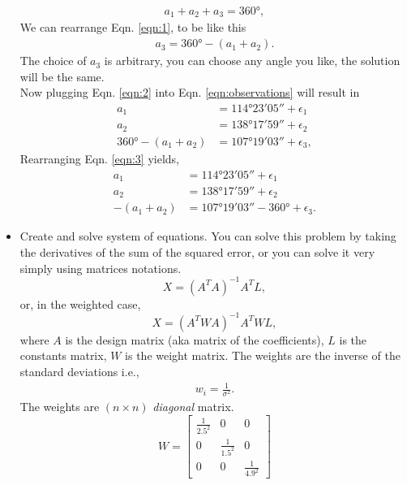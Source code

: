 \documentclass[]{scrartcl}
\begin{document}
\begin{itemize}
	\begin{eqnarray}
	\label{eqn:1}
	a_1 + a_2 + a_3 = \ang{360},
	\end{eqnarray}
	We can rearrange Eqn. \eqref{eqn:1}, to be like this
	\begin{eqnarray}
		\label{eqn:2}
		a_3 = \ang{360} - ( a_1 + a_2).
	\end{eqnarray}
	The choice of $a_3$ is arbitrary, you can choose any angle you like, the solution will be the same.
	\\
	Now plugging Eqn. \eqref{eqn:2} into Eqn. \eqref{eqn:observations} will result in
	\begin{eqnarray}
	\label{eqn:3}
		a_1 &= \ang{114; 23; 05} + \epsilon_1\\
		a_2 &= \ang{138; 17; 59} + \epsilon_2\\
		\ang{360} - (a_1 + a_2) &= \ang{107; 19; 03} + \epsilon_3,
	\end{eqnarray}
	Rearranging Eqn. \eqref{eqn:3} yields,
	\begin{eqnarray}
	\label{eqn:4}
		a_1 &= \ang{114; 23; 05} + \epsilon_1\\
		a_2 &= \ang{138; 17; 59} + \epsilon_2\\
		-(a_1 + a_2) &= \ang{107; 19; 03} - \ang{360}  + \epsilon_3.
	\end{eqnarray}
	\item Create and solve system of equations. You can solve this problem by taking the derivatives of the sum of the squared error, or you can solve it very simply using matrices notations.
	\begin{equation}
		X = (A^TA)^{-1}A^TL,
	\end{equation}
	or, in the weighted case,
		\begin{equation}
		\label{eqn:weighted}
		X = (A^TWA)^{-1}A^TWL,
		\end{equation}
		where $A$ is the design matrix (aka matrix of the coefficients), $L$ is the constants matrix, $W$ is the weight matrix. The weights are the inverse of the standard deviations i.e.,
		\begin{eqnarray}
		w_i = \frac{1}{\sigma^2}.
		\end{eqnarray}
		The weights are $(n \times n)$ \textit{diagonal} matrix.
		\begin{equation}
			W = \begin{bmatrix}
				\frac{1}{2.5^2} & 0 & 0\\
				0 & \frac{1}{1.5^2} & 0\\
				0 & 0 & \frac{1}{4.9^2}
			\end{bmatrix}

\end{equation}
\end{itemize}
\end{document}
